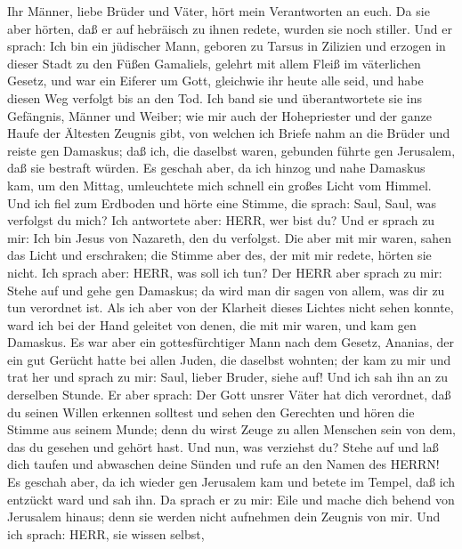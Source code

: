  Ihr Männer, liebe Brüder und Väter, hört mein Verantworten
an euch.  Da sie aber hörten, daß er auf hebräisch zu ihnen
redete, wurden sie noch stiller. Und er sprach:  Ich bin ein
jüdischer Mann, geboren zu Tarsus in Zilizien und erzogen in dieser
Stadt zu den Füßen Gamaliels, gelehrt mit allem Fleiß im väterlichen
Gesetz, und war ein Eiferer um Gott, gleichwie ihr heute alle seid,
 und habe diesen Weg verfolgt bis an den Tod. Ich band sie
und überantwortete sie ins Gefängnis, Männer und Weiber; 
wie mir auch der Hohepriester und der ganze Haufe der Ältesten Zeugnis
gibt, von welchen ich Briefe nahm an die Brüder und reiste gen Damaskus;
daß ich, die daselbst waren, gebunden führte gen Jerusalem, daß sie
bestraft würden.  Es geschah aber, da ich hinzog und nahe
Damaskus kam, um den Mittag, umleuchtete mich schnell ein großes Licht
vom Himmel.  Und ich fiel zum Erdboden und hörte eine
Stimme, die sprach: Saul, Saul, was verfolgst du mich?  Ich
antwortete aber: HERR, wer bist du? Und er sprach zu mir: Ich bin Jesus
von Nazareth, den du verfolgst.  Die aber mit mir waren,
sahen das Licht und erschraken; die Stimme aber des, der mit mir redete,
hörten sie nicht.  Ich sprach aber: HERR, was soll ich tun?
Der HERR aber sprach zu mir: Stehe auf und gehe gen Damaskus; da wird
man dir sagen von allem, was dir zu tun verordnet ist.  Als
ich aber von der Klarheit dieses Lichtes nicht sehen konnte, ward ich
bei der Hand geleitet von denen, die mit mir waren, und kam gen
Damaskus.  Es war aber ein gottesfürchtiger Mann nach dem
Gesetz, Ananias, der ein gut Gerücht hatte bei allen Juden, die daselbst
wohnten;  der kam zu mir und trat her und sprach zu mir:
Saul, lieber Bruder, siehe auf! Und ich sah ihn an zu derselben Stunde.
 Er aber sprach: Der Gott unsrer Väter hat dich verordnet,
daß du seinen Willen erkennen solltest und sehen den Gerechten und hören
die Stimme aus seinem Munde;  denn du wirst Zeuge zu allen
Menschen sein von dem, das du gesehen und gehört hast.  Und
nun, was verziehst du? Stehe auf und laß dich taufen und abwaschen deine
Sünden und rufe an den Namen des HERRN!  Es geschah aber,
da ich wieder gen Jerusalem kam und betete im Tempel, daß ich entzückt
ward und sah ihn.  Da sprach er zu mir: Eile und mache dich
behend von Jerusalem hinaus; denn sie werden nicht aufnehmen dein
Zeugnis von mir.  Und ich sprach: HERR, sie wissen selbst,
